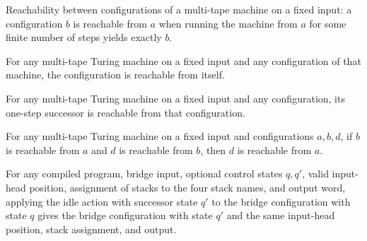 \begin{definition}
\label{Turing.bridgeReach}
\leanok
{}
Reachability between configurations of a multi-tape machine on a fixed input: a
configuration $b$ is reachable from $a$ when running the machine from $a$ for some
finite number of steps yields exactly $b$.
\end{definition}

\begin{lemma}
\label{Turing.bridgeReach_refl}
\leanok
{}
For any multi-tape Turing machine on a fixed input and any configuration of that
machine, the configuration is reachable from itself.
\end{lemma}

\begin{lemma}
\label{Turing.bridgeReach_step}
\leanok
{}
For any multi-tape Turing machine on a fixed input and any configuration, its one-step
successor is reachable from that configuration.
\end{lemma}

\begin{lemma}
\label{Turing.bridgeReach_trans}
\leanok
{}
For any multi-tape Turing machine on a fixed input and configurations $a,b,d$, if $b$ is
reachable from $a$ and $d$ is reachable from $b$, then $d$ is reachable from $a$.
\end{lemma}

\begin{lemma}
\label{Turing.bridgeCfg_idle}
\leanok
{}
For any compiled program, bridge input, optional control states $q,q'$, valid input-head
position, assignment of stacks to the four stack names, and output word, applying the
idle action with successor state $q'$ to the bridge configuration with state $q$ gives
the bridge configuration with state $q'$ and the same input-head position, stack
assignment, and output.
\end{lemma}

